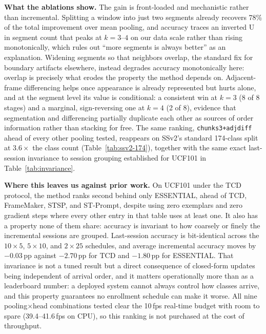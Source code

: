 \documentclass[a4paper,fleqn]{cas-dc}
\begin{document}
\textbf{What the ablations show.} The gain is front-loaded and mechanistic
rather than incremental. Splitting a window into just two segments already
recovers 78\% of the total improvement over mean pooling, and accuracy
traces an inverted U in segment count that peaks at $k{=}3$--$4$ on our
data scale rather than rising monotonically, which rules out ``more
segments is always better'' as an explanation. Widening segments so that
neighbors overlap, the standard fix for boundary artifacts elsewhere,
instead degrades accuracy monotonically here: overlap is precisely what
erodes the property the method depends on. Adjacent-frame differencing
helps once appearance is already represented but hurts alone, and at the
segment level its value is conditional: a consistent win at $k{=}3$ (8 of 8
stages) and a marginal, sign-reversing one at $k{=}4$ (2 of 8), evidence
that segmentation and differencing partially duplicate each other as
sources of order information rather than stacking for free. The same
ranking, \texttt{chunks3+adjdiff} ahead of every other pooling tested,
reappears on SSv2's standard 174-class split at $3.6\times$ the class
count (Table~\ref{tab:ssv2-174}), together with the same exact
last-session invariance to session grouping established for UCF101 in
Table~\ref{tab:invariance}.

\textbf{Where this leaves us against prior work.} On UCF101 under the TCD
protocol, the method ranks second behind only ESSENTIAL, ahead of TCD,
FrameMaker, STSP, and ST-Prompt, despite using zero exemplars and zero
gradient steps where every other entry in that table uses at least one. It
also has a property none of them share: accuracy is invariant to how
coarsely or finely the incremental sessions are grouped. Last-session
accuracy is bit-identical across the $10\times5$, $5\times10$, and
$2\times25$ schedules, and average incremental accuracy moves by
$-0.03$\,pp against $-2.70$\,pp for TCD and $-1.80$\,pp for ESSENTIAL. That invariance is not a
tuned result but a direct consequence of closed-form updates being
independent of arrival order, and it matters operationally more than as a
leaderboard number: a deployed system cannot always control how classes
arrive, and this property guarantees no enrollment schedule can make it
worse. All nine pooling$\times$head combinations tested clear the 10\,fps
real-time budget with room to spare (39.4--41.6\,fps on CPU), so this
ranking is not purchased at the cost of throughput.
\end{document}
